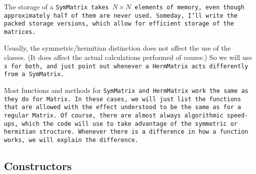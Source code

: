 The storage of a \tt{SymMatrix} takes
$N \times N$ elements of memory, even though approximately half of them 
are never used.  Someday, I'll write the packed storage versions, which allow for
efficient storage of the matrices.

Usually, the symmetric/hermitian distinction does not affect the use of the classes.
(It does affect the actual calculations performed of course.)  So we will use 
\tt{s} for both, and just point out whenever a \tt{HermMatrix} acts differently
from a \tt{SymMatrix}.

Most functions and methods for \tt{SymMatrix} and \tt{HermMatrix}
work the same as they do for \tt{Matrix}.
In these cases, we will just list the functions that are allowed with the
effect understood to be the same as for a regular \tt{Matrix}.  Of course, there are 
almost always algorithmic speed-ups, which the code will use to take advantage of the 
symmetric or hermitian structure.
Whenever there is a difference in how a function works,
we will explain the difference.


\subsection{Constructors}
\label{SymMatrix_Constructors}

